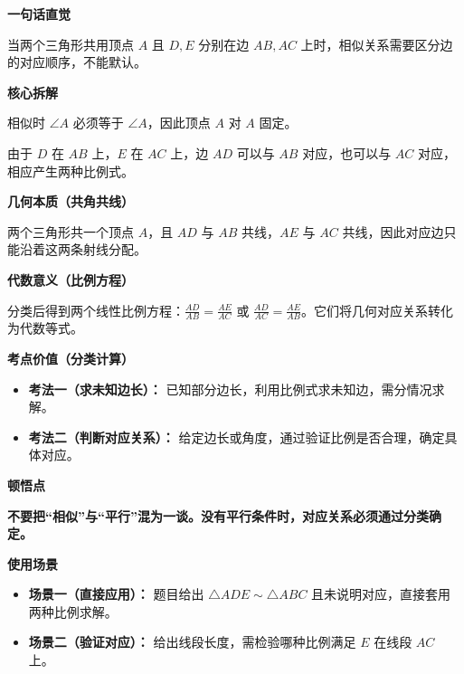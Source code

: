 \begin{explanationbox}
	\textbf{\textcolor{CExplanation}{一句话直觉}}

	当两个三角形共用顶点 $A$ 且 $D,E$ 分别在边 $AB,AC$ 上时，相似关系需要区分边的对应顺序，不能默认。

	\medskip
	\textbf{\textcolor{CExplanation}{核心拆解}}
	\begin{description}[style=nextline, leftmargin=2.8em, labelsep=0.5em, itemsep=0.45em]
		\item[\textbf{要点一（公共角固定）：}] 相似时 $\angle A$ 必须等于 $\angle A$，因此顶点 $A$ 对 $A$ 固定。
		\item[\textbf{要点二（对应边两种）：}] 由于 $D$ 在 $AB$ 上，$E$ 在 $AC$ 上，边 $AD$ 可以与 $AB$ 对应，也可以与 $AC$ 对应，相应产生两种比例式。
	\end{description}

	\medskip
	\textbf{\textcolor{CExplanation}{几何本质（共角共线）}}

	两个三角形共一个顶点 $A$，且 $AD$ 与 $AB$ 共线，$AE$ 与 $AC$ 共线，因此对应边只能沿着这两条射线分配。

	\medskip
	\textbf{\textcolor{CExplanation}{代数意义（比例方程）}}

	分类后得到两个线性比例方程：$\frac{AD}{AB}=\frac{AE}{AC}$ 或 $\frac{AD}{AC}=\frac{AE}{AB}$。它们将几何对应关系转化为代数等式。

	\medskip
	\textbf{\textcolor{CExplanation}{考点价值（分类计算）}}
	\begin{itemize}[leftmargin=*, itemsep=0.5em, topsep=0.4em]
		\item \textbf{考法一（求未知边长）：} 已知部分边长，利用比例式求未知边，需分情况求解。
		\item \textbf{考法二（判断对应关系）：} 给定边长或角度，通过验证比例是否合理，确定具体对应。
	\end{itemize}

	\medskip
	\textbf{\textcolor{CExplanation}{顿悟点}}

	\textbf{不要把“相似”与“平行”混为一谈。没有平行条件时，对应关系必须通过分类确定。}

	\medskip
	\textbf{\textcolor{CExplanation}{使用场景}}
	\begin{itemize}[leftmargin=*, itemsep=0.5em, topsep=0.4em]
		\item \textbf{场景一（直接应用）：} 题目给出 $\triangle ADE\sim\triangle ABC$ 且未说明对应，直接套用两种比例求解。
		\item \textbf{场景二（验证对应）：} 给出线段长度，需检验哪种比例满足 $E$ 在线段 $AC$ 上。
	\end{itemize}
\end{explanationbox}
